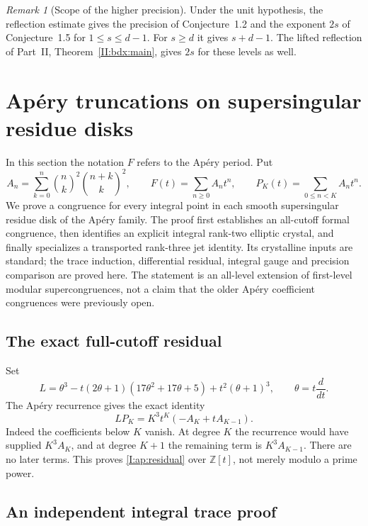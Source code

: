 \documentclass[11pt,letterpaper]{article}
\theoremstyle{definition}
\theoremstyle{remark}
\newtheorem{remark}[theorem]{Remark}
\begin{document}
\begin{remark}[Scope of the higher precision]
Under the unit hypothesis, the reflection estimate gives the precision of
Conjecture~1.2 and the exponent $2s$ of Conjecture~1.5 for $1\le s\le d-1$.
For $s\ge d$ it gives $s+d-1$. The lifted reflection of Part~II,
Theorem~\ref{II:bdx:main}, gives $2s$ for these levels as well.
\end{remark}


\section{Ap\'ery truncations on supersingular residue disks}\label{I:sec:apery}

In this section the notation $F$ refers to the Ap\'ery period. Put
\[
 A_n=\sum_{k=0}^n\binom nk^2\binom{n+k}k^2,\qquad
 F(t)=\sum_{n\geq0}A_nt^n,\qquad P_K(t)=\sum_{0\leq n<K}A_nt^n.
\]
We prove a congruence for every integral point in each smooth
supersingular residue disk of the Ap\'ery family. The proof first
establishes an all-cutoff formal congruence, then identifies an explicit
integral rank-two elliptic crystal, and finally specializes a transported
rank-three jet identity. Its crystalline inputs are standard;
the trace induction, differential residual, integral gauge and precision
comparison are proved here. The statement is an all-level extension of
first-level modular supercongruences, not a claim that the older Ap\'ery
coefficient congruences were previously open.

\subsection{The exact full-cutoff residual}

Set
\[
 L=\theta^3-t(2\theta+1)(17\theta^2+17\theta+5)
       +t^2(\theta+1)^3,\qquad\theta=t\frac d{dt}.
\]
The Ap\'ery recurrence gives the exact identity
\begin{equation}\label{I:ap:residual}
 LP_K=K^3t^K(-A_K+tA_{K-1}).
\end{equation}
Indeed the coefficients below $K$ vanish. At degree $K$ the recurrence
would have supplied $K^3 A_K$, and at degree $K+1$ the remaining term is
$K^3 A_{K-1}$. There are no later terms. This proves
\eqref{I:ap:residual} over $\mathbb Z[t]$, not merely modulo a prime power.

\subsection{An independent integral trace proof}
\end{document}
